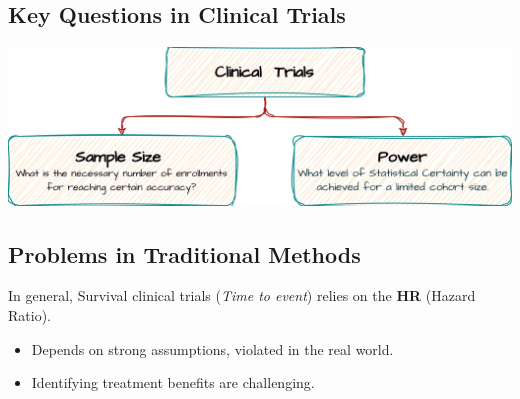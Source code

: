 \documentclass[a0,landscape]{a0poster}
\newcommand{\xmark}{\ding{55}}              %
\begin{document}
\begin{minipage}[t]{0.44\linewidth}

    \subsection*{\color{HeadingColor}\huge Key Questions in Clinical Trials}
    {\centering \includegraphics[width=\linewidth,height = 0.5\linewidth]{images/CT-intro.png}\par}

    \subsection*{\color{HeadingColor}\huge Problems in Traditional Methods}
    \Large In general, Survival clinical trials (\textit{Time to event}) relies on the \textbf{HR} (Hazard Ratio).
   \begin{itemize}[label={\color{BulletColor}\Large \xmark}]
    \item \Large Depends on strong assumptions, violated in the real world.
    \item \Large Identifying treatment benefits are challenging.
\end{itemize}
\hfill

\end{minipage}
\end{document}
